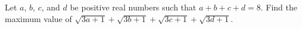 Let $a$, $b$, $c$, and $d$ be positive real numbers such that $a+b+c+d=8$. Find the maximum value of $\sqrt{3a+1}+\sqrt{3b+1}+\sqrt{3c+1}+\sqrt{3d+1}$.
